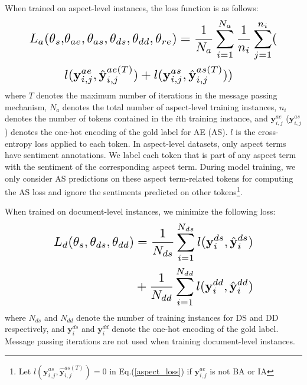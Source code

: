 \documentclass[11pt,a4paper]{article}
\begin{document}
When trained on aspect-level instances, the loss function is as follows:
\begin{equation}
\resizebox{.87\hsize}{!}{$
    \begin{split}
     L_{a}(\theta_{s}, &\theta_{ae}, \theta_{as}, \theta_{ds}, \theta_{dd}, \theta_{re}) = \frac{1}{N_a}\sum\limits_{i=1}^{N_a} \frac{1}{n_i} \sum\limits_{j=1}^{n_i} (\\ &l(\mathbf{y}_{i,j}^{ae}, \hat{\mathbf{y}}_{i,j}^{ae(T)})+l(\mathbf{y}_{i,j}^{as}, \hat{\mathbf{y}}_{i,j}^{as(T)}))
    \end{split}
$}\label{aspect_loss}
\end{equation}
where $T$ denotes the maximum number of iterations in the message passing mechanism, $N_a$ denotes the total number of aspect-level training instances, $n_i$ denotes the number of tokens contained in the $i$th training instance, and $\mathbf{y}_{i,j}^{ae}$ ($\mathbf{y}_{i,j}^{as}$) denotes the one-hot encoding of the gold label for AE (AS). $l$ is the cross-entropy loss applied to each token. In aspect-level datasets, only aspect terms have sentiment annotations. We label each token that is part of any aspect term with the sentiment of the corresponding aspect term. During model training, we only consider AS predictions on these aspect term-related tokens for computing the AS loss and ignore the sentiments predicted on other tokens\footnote{Let $l(\mathbf{y}_{i,j}^{as}, \hat{\mathbf{y}}_{i,j}^{as(T)}) = 0$ in Eq.(\ref{aspect_loss}) if $\mathbf{y}_{i,j}^{ae}$ is not BA or IA}. 


When trained on document-level instances, we minimize the following loss:
\begin{equation}
\resizebox{.7\hsize}{!}{$
\begin{split}
   L_d(\theta_s, \theta_{ds}, \theta_{dd}) &= \frac{1}{N_{ds}} \sum_{i=1}^{N_{ds}} l( \mathbf{y}_i^{ds}, \hat{\mathbf{y}}_i^{ds})\\
    &+ \frac{1}{N_{dd}} \sum_{i=1}^{N_{dd}} l( \mathbf{y}_i^{dd}, \hat{\mathbf{y}}_i^{dd})
\end{split}
$}
\end{equation}
\noindent where $N_{ds}$ and $N_{dd}$ denote the number of training instances for DS and DD respectively, and $\mathbf{y}_i^{ds}$ and $\mathbf{y}_i^{dd}$ denote the one-hot encoding of the gold label. Message passing iterations are not used when training document-level instances.
\end{document}

